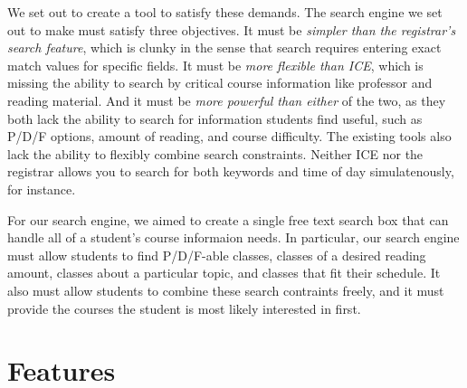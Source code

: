 \documentclass[12pt,letterpaper]{article}
\begin{document}
We set out to create a tool to satisfy these demands. The search engine we set out to make must satisfy three objectives. It must be \emph{simpler than the registrar's search feature}, which is clunky in the sense that search requires entering exact match values for specific fields. It must be \emph{more flexible than ICE}, which is missing the ability to search by critical course information like professor and reading material. And it must be \emph{more powerful than either} of the two, as they both lack the ability to search for information students find useful, such as P/D/F options, amount of reading, and course difficulty. The existing tools also lack the ability to flexibly combine search constraints. Neither ICE nor the registrar allows you to search for both keywords and time of day simulatenously, for instance.
	
For our search engine, we aimed to create a single free text search box that can handle all of a student's course informaion needs. In particular, our search engine must allow students to find P/D/F-able classes, classes of a desired reading amount, classes about a particular topic, and classes that fit their schedule. It also must allow students to combine these search contraints freely, and it must provide the courses the student is most likely interested in first.
	
\section{Features}
\end{document}
